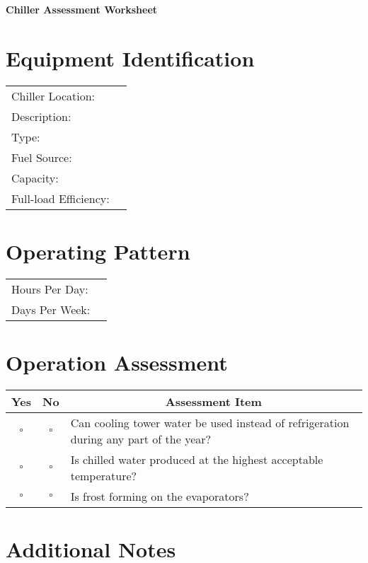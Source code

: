 \documentclass[./main.tex]{subfiles}
\begin{document}
\begin{center}
\Large\textbf{Chiller Assessment Worksheet}
\end{center}

\section*{Equipment Identification}
\noindent\begin{tabularx}{\textwidth}{@{}lX@{}}
Chiller Location: & \hrulefill \\[2ex]
Description: & \hrulefill \\[2ex]
Type: & \hrulefill \\[2ex]
Fuel Source: & \hrulefill \\[2ex]
Capacity: & \hrulefill \\[2ex]
Full-load Efficiency: & \hrulefill \\[2ex]
\end{tabularx}

\section*{Operating Pattern}
\noindent\begin{tabularx}{\textwidth}{@{}lX@{}}
Hours Per Day: & \hrulefill \\[2ex]
Days Per Week: & \hrulefill \\[2ex]
\end{tabularx}

\section*{Operation Assessment}
\begin{tabular}{|c|c|p{14cm}|}
\hline
\multicolumn{1}{|c|}{\textbf{Yes}} & \multicolumn{1}{c|}{\textbf{No}} & \multicolumn{1}{c|}{\textbf{Assessment Item}} \\
\hline
$\square$ & $\square$ & Can cooling tower water be used instead of refrigeration during any part of the year? \\
\hline
$\square$ & $\square$ & Is chilled water produced at the highest acceptable temperature? \\
\hline
$\square$ & $\square$ & Is frost forming on the evaporators? \\
\hline
\end{tabular}

\section*{Additional Notes}
\end{document}
